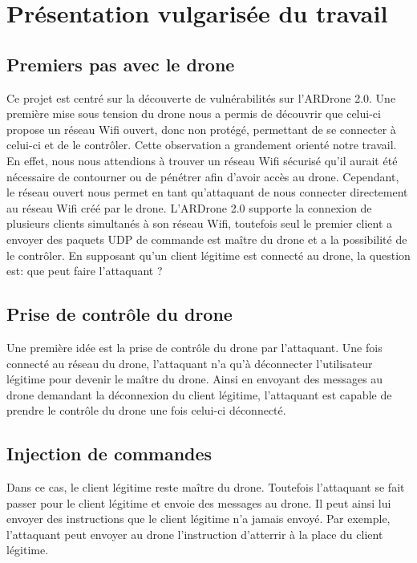 \section{Présentation vulgarisée du travail}
\subsection{Premiers pas avec le drone}
Ce projet est centré sur la découverte de vulnérabilités sur l'ARDrone 2.0. Une première mise sous tension du drone nous a permis de découvrir que celui-ci propose un réseau Wifi ouvert, donc non protégé, permettant de se connecter à celui-ci et de le contrôler. Cette observation a grandement orienté notre travail. En effet, nous nous attendions à trouver un réseau Wifi sécurisé qu'il aurait été nécessaire de contourner ou de pénétrer afin d'avoir accès au drone. Cependant, le réseau ouvert nous permet en tant qu'attaquant de nous connecter directement au réseau Wifi créé par le drone. L'ARDrone 2.0 supporte la connexion de plusieurs clients simultanés à son réseau Wifi, toutefois seul le premier client a envoyer des paquets UDP de commande est maître du drone et a la possibilité de le contrôler. En supposant qu'un client légitime est connecté au drone, la question est: que peut faire l'attaquant ?

\subsection{Prise de contrôle du drone}
Une première idée est la prise de contrôle du drone par l'attaquant. Une fois connecté au réseau du drone, l'attaquant n'a qu'à déconnecter l'utilisateur légitime pour devenir le maître du drone. Ainsi en envoyant des messages au drone demandant la déconnexion du client légitime, l'attaquant est capable de prendre le contrôle du drone une fois celui-ci déconnecté.

\subsection{Injection de commandes}
Dans ce cas, le client légitime reste maître du drone. Toutefois l'attaquant se fait passer pour le client légitime et envoie des messages au drone. Il peut ainsi lui envoyer des instructions que le client légitime n'a jamais envoyé. Par exemple, l'attaquant peut envoyer au drone l'instruction d'atterrir à la place du client légitime.

